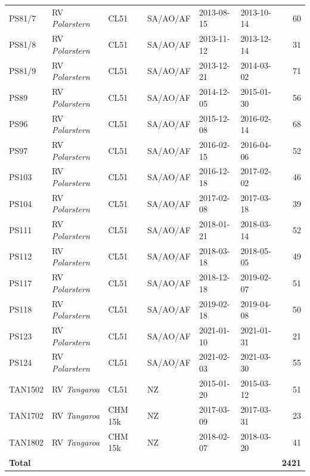 \documentclass[12pt,a4paper]{article}
\begin{document}
\begin{table}
\begin{tabular}{llllllr}
PS81/7   & RV \emph{Polarstern}          & CL51    & SA/AO/AF & 2013-08-15 & 2013-10-14 & 60 \\
PS81/8   & RV \emph{Polarstern}          & CL51    & SA/AO/AF & 2013-11-12 & 2013-12-14 & 31 \\
PS81/9   & RV \emph{Polarstern}          & CL51    & SA/AO/AF & 2013-12-21 & 2014-03-02 & 71 \\
PS89     & RV \emph{Polarstern}          & CL51    & SA/AO/AF & 2014-12-05 & 2015-01-30 & 56 \\
PS96     & RV \emph{Polarstern}          & CL51    & SA/AO/AF & 2015-12-08 & 2016-02-14 & 68 \\
PS97     & RV \emph{Polarstern}          & CL51    & SA/AO/AF & 2016-02-15 & 2016-04-06 & 52 \\
PS103    & RV \emph{Polarstern}          & CL51    & SA/AO/AF & 2016-12-18 & 2017-02-02 & 46 \\
PS104    & RV \emph{Polarstern}          & CL51    & SA/AO/AF & 2017-02-08 & 2017-03-18 & 39 \\
PS111    & RV \emph{Polarstern}          & CL51    & SA/AO/AF & 2018-01-21 & 2018-03-14 & 52 \\
PS112    & RV \emph{Polarstern}          & CL51    & SA/AO/AF & 2018-03-18 & 2018-05-05 & 49 \\
PS117    & RV \emph{Polarstern}          & CL51    & SA/AO/AF & 2018-12-18 & 2019-02-07 & 51 \\
PS118    & RV \emph{Polarstern}          & CL51    & SA/AO/AF & 2019-02-18 & 2019-04-08 & 50 \\
PS123    & RV \emph{Polarstern}          & CL51    & SA/AO/AF & 2021-01-10 & 2021-01-31 & 21 \\
PS124    & RV \emph{Polarstern}          & CL51    & SA/AO/AF & 2021-02-03 & 2021-03-30 & 55 \\
TAN1502  & RV \emph{Tangaroa}            & CL51    & NZ       & 2015-01-20 & 2015-03-12 & 51 \\
TAN1702  & RV \emph{Tangaroa}            & CHM 15k & NZ       & 2017-03-09 & 2017-03-31 & 23 \\
TAN1802  & RV \emph{Tangaroa}            & CHM 15k & NZ       & 2018-02-07 & 2018-03-20 & 41 \\
\hline
\textbf{Total} &                         &          &            &            &         & \textbf{2421}\\
\end{tabular}
\normalsize
\end{table}
\end{document}

